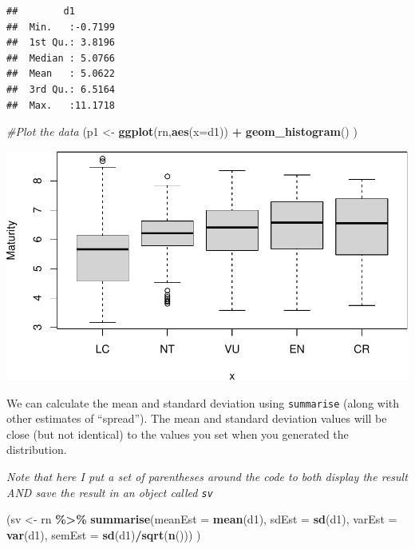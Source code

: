 \documentclass[
  a4paperpaper,
]{book}
\newenvironment{Shaded}{\begin{snugshade}}{\end{snugshade}}
\newcommand{\CommentTok}[1]{\textcolor[rgb]{0.56,0.35,0.01}{\textit{#1}}}
\newcommand{\DataTypeTok}[1]{\textcolor[rgb]{0.13,0.29,0.53}{#1}}
\newcommand{\KeywordTok}[1]{\textcolor[rgb]{0.13,0.29,0.53}{\textbf{#1}}}
\newcommand{\NormalTok}[1]{#1}
\newcommand{\OperatorTok}[1]{\textcolor[rgb]{0.81,0.36,0.00}{\textbf{#1}}}
\newcommand{\StringTok}[1]{\textcolor[rgb]{0.31,0.60,0.02}{#1}}
\begin{document}
\begin{verbatim}
##        d1         
##  Min.   :-0.7199  
##  1st Qu.: 3.8196  
##  Median : 5.0766  
##  Mean   : 5.0622  
##  3rd Qu.: 6.5164  
##  Max.   :11.1718
\end{verbatim}

\begin{Shaded}
\begin{Highlighting}[]
\CommentTok{\#Plot the data}
\NormalTok{(p1 \textless{}{-}}\StringTok{ }\KeywordTok{ggplot}\NormalTok{(rn,}\KeywordTok{aes}\NormalTok{(}\DataTypeTok{x=}\NormalTok{d1)) }\OperatorTok{+}\StringTok{ }
\StringTok{  }\KeywordTok{geom\_histogram}\NormalTok{()}
\NormalTok{  )}
\end{Highlighting}
\end{Shaded}

\begin{center}\includegraphics{BB852_files/figure-latex/unnamed-chunk-94-1} \end{center}

We can calculate the mean and standard deviation using \texttt{summarise} (along with other estimates of ``spread''). The mean and standard deviation values will be close (but not identical) to the values you set when you generated the distribution.

\emph{Note that here I put a set of parentheses around the code to both display the result AND save the result in an object called \texttt{sv}}

\begin{Shaded}
\begin{Highlighting}[]
\NormalTok{(sv \textless{}{-}}\StringTok{ }\NormalTok{rn }\OperatorTok{\%\textgreater{}\%}\StringTok{ }
\StringTok{  }\KeywordTok{summarise}\NormalTok{(}\DataTypeTok{meanEst =} \KeywordTok{mean}\NormalTok{(d1),}
            \DataTypeTok{sdEst =} \KeywordTok{sd}\NormalTok{(d1),}
            \DataTypeTok{varEst =} \KeywordTok{var}\NormalTok{(d1),}
            \DataTypeTok{semEst =} \KeywordTok{sd}\NormalTok{(d1)}\OperatorTok{/}\KeywordTok{sqrt}\NormalTok{(}\KeywordTok{n}\NormalTok{()))}
\NormalTok{ )}
\end{Highlighting}
\end{Shaded}
\end{document}
